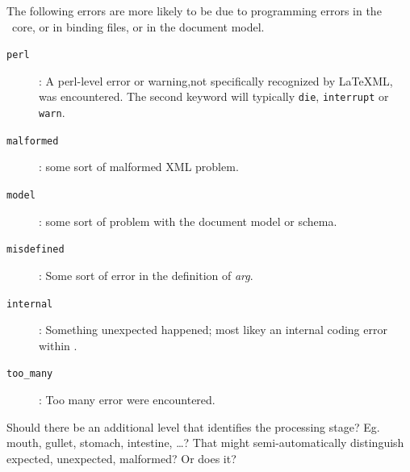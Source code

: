 \documentclass{book}
\begin{document}
The following errors are more likely to be due to programming errors in the
\LaTeXML\ core, or in binding files, or in the document model.
\begin{description}
\item[\texttt{perl}]: A perl-level error or warning,not specifically recognized
 by LaTeXML, was encountered.
The second keyword will typically \texttt{die}, \texttt{interrupt} or \texttt{warn}.
\item[\texttt{malformed}]: some sort of malformed XML problem.
\item[\texttt{model}]: some sort of problem with the document model or schema.
\item[\texttt{misdefined}]: Some sort of error in the definition of \textit{arg}.
\item[\texttt{internal}]: Something unexpected happened; most likey an
internal coding error within \LaTeXML.
\item[\texttt{too\_many}]: Too many error were encountered.
\end{description}


Should there be an additional level that identifies the processing stage?
Eg.~ mouth, gullet, stomach, intestine, \ldots ?
That might semi-automatically distinguish expected, unexpected, malformed?
Or does it?


\backmatter
\printindex
\end{document}

